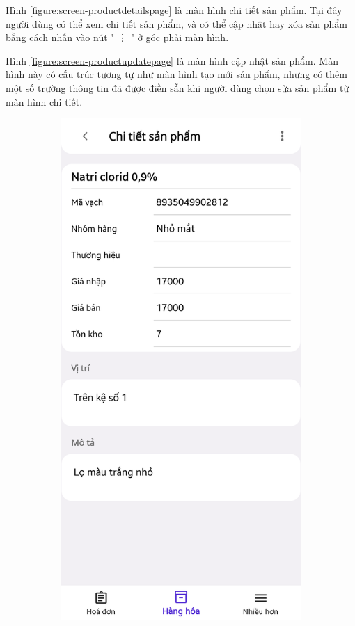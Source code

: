 \documentclass[../DoAn.tex]{subfiles}
\begin{document}
Hình \ref{figure:screen-productdetailspage} là màn hình chi tiết sản phẩm. Tại đây người dùng có thể xem chi tiết sản phẩm, và có thể cập nhật hay xóa sản phẩm bằng cách nhấn vào nút " \vdots{} " ở góc phải màn hình.

Hình \ref{figure:screen-productupdatepage} là màn hình cập nhật sản phẩm. Màn hình này có cấu trúc tương tự như màn hình tạo mới sản phẩm, nhưng có thêm một số trường thông tin đã được điền sẵn khi người dùng chọn sửa sản phẩm từ màn hình chi tiết.
\begin{figure}[H]
    \begin{subfigure}{0.49\linewidth}
        \centering
        \includegraphics[width=0.9\linewidth]{Hinhve/design/screens/ProductDetailsPage}

\end{subfigure}
\end{figure}
\end{document}
